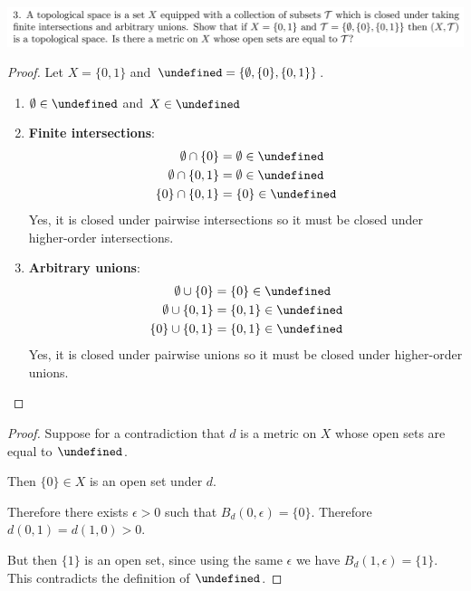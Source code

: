 \documentclass[12pt]{article}
\begin{document}
\newpage
\subsection{}
\let\T\undefined
\newcommand{\T}{\mathcal T}

\begin{mdframed}
\includegraphics[width=400pt]{img/oxford-a2-2-3.png}
\end{mdframed}

\begin{proof}
  Let $X = \{0, 1\}$ and $\T = \{\emptyset, \{0\}, \{0, 1\}\}$.
  \begin{enumerate}
  \item $\emptyset \in \T$ and $X \in \T$ \checkmark
  \item {\bf Finite intersections}: \checkmark
    \begin{align*}
      \emptyset \cap \{0\}    &= \emptyset \in \T \\
      \emptyset \cap \{0, 1\} &= \emptyset \in \T \\
      \{0\}     \cap \{0, 1\} &= \{0\} \in \T
    \end{align*}
    Yes, it is closed under pairwise intersections so it must be closed under higher-order
    intersections. 
  \item {\bf Arbitrary unions}: \checkmark
    \begin{align*}
      \emptyset \cup \{0\}    &= \{0\}    \in \T \\
      \emptyset \cup \{0, 1\} &= \{0, 1\} \in \T \\
      \{0\}     \cup \{0, 1\} &= \{0, 1\} \in \T
    \end{align*}
    Yes, it is closed under pairwise unions so it must be closed under higher-order
    unions.
  \end{enumerate}
\end{proof}

\begin{proof}
  Suppose for a contradiction that $d$ is a metric on $X$ whose open sets are equal to $\T$.

  Then $\{0\} \in X$ is an open set under $d$.

  Therefore there exists $\epsilon > 0$ such that $B_d(0, \epsilon) = \{0\}$. Therefore
  $d(0, 1) = d(1, 0) > 0$.

  But then $\{1\}$ is an open set, since using the same $\epsilon$ we have
  $B_d(1, \epsilon) = \{1\}$. This contradicts the definition of $\T$.
\end{proof}
\end{document}

